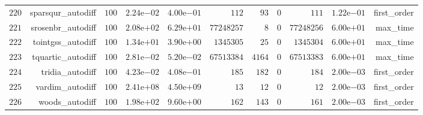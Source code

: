 \documentclass[varwidth=20cm,crop=true]{standalone}
\begin{document}
\begin{longtable}{rrrrrrrrrrr}
  \(   220\) & sparsqur\_autodiff & \(   100\) & \( 2.24\)e\(-02\) & \( 4.00\)e\(-01\) & \(   112\) & \(    93\) & \(     0\) & \(   111\) & \( 1.22\)e\(-01\) & first\_order \\
  \(   221\) & srosenbr\_autodiff & \(   100\) & \( 2.08\)e\(+02\) & \( 6.29\)e\(+01\) & \(77248257\) & \(     8\) & \(     0\) & \(77248256\) & \( 6.00\)e\(+01\) & max\_time \\
  \(   222\) & tointgss\_autodiff & \(   100\) & \( 1.34\)e\(+01\) & \( 3.90\)e\(+00\) & \(1345305\) & \(    25\) & \(     0\) & \(1345304\) & \( 6.00\)e\(+01\) & max\_time \\
  \(   223\) & tquartic\_autodiff & \(   100\) & \( 2.81\)e\(-02\) & \( 5.20\)e\(-02\) & \(67513384\) & \(  4164\) & \(     0\) & \(67513383\) & \( 6.00\)e\(+01\) & max\_time \\
  \(   224\) & tridia\_autodiff & \(   100\) & \( 4.23\)e\(-02\) & \( 4.08\)e\(-01\) & \(   185\) & \(   182\) & \(     0\) & \(   184\) & \( 2.00\)e\(-03\) & first\_order \\
  \(   225\) & vardim\_autodiff & \(   100\) & \( 2.41\)e\(+08\) & \( 4.50\)e\(+09\) & \(    13\) & \(    12\) & \(     0\) & \(    12\) & \( 2.00\)e\(-03\) & first\_order \\
  \(   226\) & woods\_autodiff & \(   100\) & \( 1.98\)e\(+02\) & \( 9.60\)e\(+00\) & \(   162\) & \(   143\) & \(     0\) & \(   161\) & \( 2.00\)e\(-03\) & first\_order \\\hline
\end{longtable}
\end{document}
